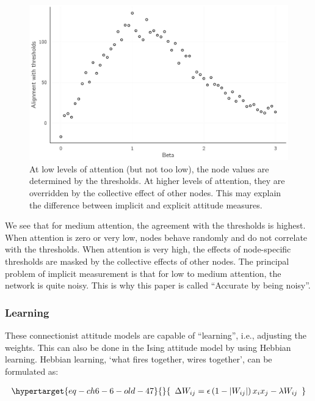 \documentclass[
  a4paper,
  DIV=11,
  numbers=noendperiod]{scrreprt}
\begin{document}
\begin{figure}

{\centering \includegraphics{media/ch6/fig-ch6-img13-old-82.jpg}

}

\caption{\label{fig-ch6-img13-old-82}At low levels of attention (but not
too low), the node values are determined by the thresholds. At higher
levels of attention, they are overridden by the collective effect of
other nodes. This may explain the difference between implicit and
explicit attitude measures.}

\end{figure}

We see that for medium attention, the agreement with the thresholds is
highest. When attention is zero or very low, nodes behave randomly and
do not correlate with the thresholds. When attention is very high, the
effects of node-specific thresholds are masked by the collective effects
of other nodes. The principal problem of implicit measurement is that
for low to medium attention, the network is quite noisy. This is why
this paper is called ``Accurate by being noisy''.

\hypertarget{sec-Learning}{%
\subsubsection{Learning}\label{sec-Learning}}

These connectionist attitude models are capable of ``learning'', i.e.,
adjusting the weights. This can also be done in the Ising attitude model
by using Hebbian learning. Hebbian learning, `what fires together, wires
together', can be formulated as:

\begin{equation}\protect\hypertarget{eq-ch6-6-old-47}{}{\begin{array}{r}
\mathrm{\Delta}W_{ij} = \epsilon\left( 1 - \left| W_{ij} \right| \right)x_{i}x_{j} - \lambda W_{ij}
\end{array}}\label{eq-ch6-6-old-47}\end{equation}
\end{document}
